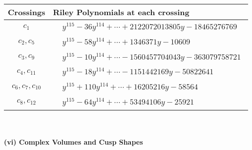 \documentclass[1p]{elsarticle_modified}
\theoremstyle{definition}
\begin{document}
\begin{tabular}{m{50pt}|m{274pt}}
Crossings & \hspace{64pt}Riley Polynomials at each crossing \\
\hline $$\begin{aligned}c_{1}\end{aligned}$$&$\begin{aligned}
&y^{115}-36 y^{114}+\cdots+2122072013805 y-18465276769
\end{aligned}$\\
\hline $$\begin{aligned}c_{2},c_{5}\end{aligned}$$&$\begin{aligned}
&y^{115}-58 y^{114}+\cdots+1346371 y-10609
\end{aligned}$\\
\hline $$\begin{aligned}c_{3},c_{9}\end{aligned}$$&$\begin{aligned}
&y^{115}-10 y^{114}+\cdots-1560457704043 y-363079758721
\end{aligned}$\\
\hline $$\begin{aligned}c_{4},c_{11}\end{aligned}$$&$\begin{aligned}
&y^{115}-18 y^{114}+\cdots-1151442169 y-50822641
\end{aligned}$\\
\hline $$\begin{aligned}c_{6},c_{7},c_{10}\end{aligned}$$&$\begin{aligned}
&y^{115}+110 y^{114}+\cdots+16205216 y-58564
\end{aligned}$\\
\hline $$\begin{aligned}c_{8},c_{12}\end{aligned}$$&$\begin{aligned}
&y^{115}-64 y^{114}+\cdots+53494106 y-25921
\end{aligned}$\\
\hline
\end{tabular}\\~\\
\newpage\flushleft \textbf{(vi) Complex Volumes and Cusp Shapes}
\end{document}
